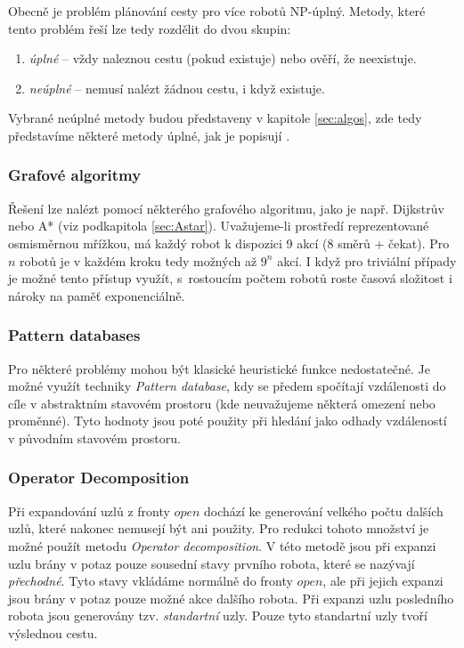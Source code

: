 Obecně je problém plánování cesty pro více robotů NP-úplný. Metody, které tento problém řeší lze tedy rozdělit do dvou skupin:
\begin{enumerate}
	\item \emph{úplné} -- vždy naleznou cestu (pokud existuje) nebo ověří, že neexistuje. %
	\item \emph{neúplné} -- nemusí nalézt žádnou cestu, i když existuje.
\end{enumerate}
Vybrané neúplné metody budou představeny v kapitole \ref{sec:algos}, zde tedy představíme některé metody úplné, jak je popisují \cite{Goldenberg2012,STANDLEY,Kraft2017}.

\subsubsection{Grafové algoritmy}
Řešení lze nalézt pomocí některého grafového algoritmu, jako je např. Dijkstrův \cite{Dijkstra1959} nebo A* (viz podkapitola \ref{sec:Astar}). Uvažujeme-li prostředí reprezentované osmisměrnou mřížkou, má každý robot k dispozici 9 akcí (8 směrů + čekat). Pro $n$ robotů je v každém kroku tedy možných až $9^n$ akcí. I když pro triviální případy je možné tento přístup využít, s~rostoucím počtem robotů roste časová složitost i nároky na paměť exponenciálně.

\subsubsection{Pattern databases}
Pro některé problémy mohou být klasické heuristické funkce nedostatečné. Je možné využít techniky \emph{Pattern database}, kdy se předem spočítají vzdálenosti do cíle v abstraktním stavovém prostoru (kde neuvažujeme některá omezení nebo proměnné). Tyto hodnoty jsou poté použity při hledání jako odhady vzdáleností v původním stavovém prostoru.

\subsubsection{Operator Decomposition}
Při expandování uzlů z fronty $open$ dochází ke generování velkého počtu dalších uzlů, které nakonec nemusejí být ani použity. Pro redukci tohoto množství je možné použít metodu \emph{Operator decomposition}. V této metodě jsou při expanzi uzlu brány v potaz pouze sousední stavy prvního robota, které se nazývají \emph{přechodné}. Tyto stavy vkládáme normálně do fronty $open$, ale při jejich expanzi jsou brány v potaz pouze možné akce dalšího robota. Při expanzi uzlu posledního robota jsou generovány tzv. \emph{standartní} uzly. Pouze tyto standartní uzly tvoří výslednou cestu. 

